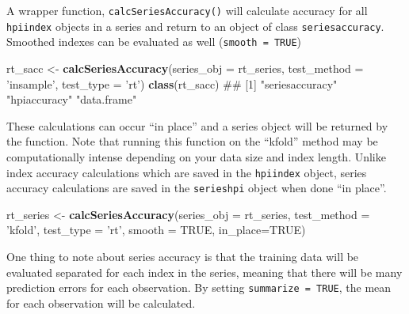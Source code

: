 \documentclass[]{article}
\newenvironment{Shaded}{\begin{snugshade}}{\end{snugshade}}
\newcommand{\DataTypeTok}[1]{\textcolor[rgb]{0.13,0.29,0.53}{#1}}
\newcommand{\KeywordTok}[1]{\textcolor[rgb]{0.13,0.29,0.53}{\textbf{#1}}}
\newcommand{\NormalTok}[1]{#1}
\newcommand{\OperatorTok}[1]{\textcolor[rgb]{0.81,0.36,0.00}{\textbf{#1}}}
\newcommand{\OtherTok}[1]{\textcolor[rgb]{0.56,0.35,0.01}{#1}}
\newcommand{\StringTok}[1]{\textcolor[rgb]{0.31,0.60,0.02}{#1}}
\begin{document}
A wrapper function, \texttt{calcSeriesAccuracy()} will calculate
accuracy for all \texttt{hpiindex} objects in a series and return to an
object of class \texttt{seriesaccuracy}. Smoothed indexes can be
evaluated as well (\texttt{smooth\ =\ TRUE})

\begin{Shaded}
\begin{Highlighting}[]
\NormalTok{  rt_sacc <-}\StringTok{ }\KeywordTok{calcSeriesAccuracy}\NormalTok{(}\DataTypeTok{series_obj =}\NormalTok{ rt_series,}
                                \DataTypeTok{test_method =} \StringTok{'insample'}\NormalTok{,}
                                \DataTypeTok{test_type =} \StringTok{'rt'}\NormalTok{)}
  \KeywordTok{class}\NormalTok{(rt_sacc)}
\NormalTok{## [1] "seriesaccuracy" "hpiaccuracy"    "data.frame"}
\end{Highlighting}
\end{Shaded}

These calculations can occur ``in place'' and a series object will be
returned by the function. Note that running this function on the
``kfold'' method may be computationally intense depending on your data
size and index length. Unlike index accuracy calculations which are
saved in the \texttt{hpiindex} object, series accuracy calculations are
saved in the \texttt{serieshpi} object when done ``in place''.

\begin{Shaded}
\begin{Highlighting}[]
\NormalTok{  rt_series <-}\StringTok{ }\KeywordTok{calcSeriesAccuracy}\NormalTok{(}\DataTypeTok{series_obj =}\NormalTok{ rt_series,}
                                  \DataTypeTok{test_method =} \StringTok{'kfold'}\NormalTok{,}
                                  \DataTypeTok{test_type =} \StringTok{'rt'}\NormalTok{,}
                                  \DataTypeTok{smooth =} \OtherTok{TRUE}\NormalTok{,}
                                  \DataTypeTok{in_place=}\OtherTok{TRUE}\NormalTok{)}
\end{Highlighting}
\end{Shaded}

One thing to note about series accuracy is that the training data will
be evaluated separated for each index in the series, meaning that there
will be many prediction errors for each observation. By setting
\texttt{summarize\ =\ TRUE}, the mean for each observation will be
calculated.

\begin{Shaded}
\end{Shaded}
\end{document}
